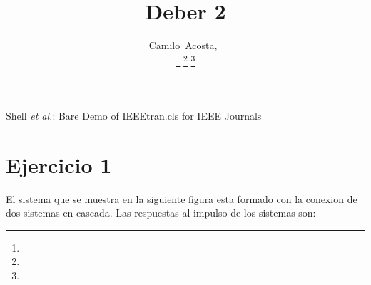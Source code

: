 \documentclass[journal]{IEEEtran}
\begin{document}
\title{Deber 2}

\author{Camilo~Acosta,~
        
\thanks{ }
\thanks{}
\thanks{}}

%
{Shell \MakeLowercase{\textit{et al.}}: Bare Demo of IEEEtran.cls for IEEE Journals}

\maketitle
\section{Ejercicio 1}

El sistema que se muestra en la siguiente figura esta formado con la conexion de dos sistemas en cascada. Las respuestas al impulso de los sistemas son:
\end{document}
